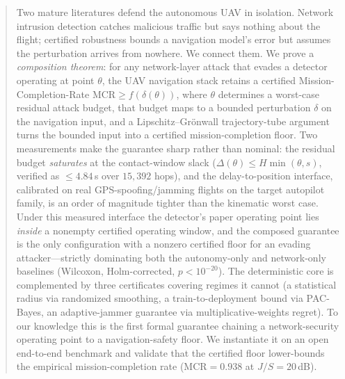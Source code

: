 \documentclass[conference]{IEEEtran}
\newcommand{\MCR}{\mathrm{MCR}}
\begin{document}
\begin{abstract}
Two mature literatures defend the autonomous UAV in isolation. Network
intrusion detection catches malicious traffic but says nothing about the flight;
certified robustness bounds a navigation model's error but assumes the
perturbation arrives from nowhere. We connect them. We prove a \emph{composition
theorem}: for any network-layer attack that evades a detector operating at point
$\theta$, the UAV navigation stack retains a certified Mission-Completion-Rate
$\MCR\ge f(\delta(\theta))$, where $\theta$ determines a worst-case residual
attack budget, that budget maps to a bounded perturbation $\delta$ on the
navigation input, and a Lipschitz--Grönwall trajectory-tube argument turns the
bounded input into a certified mission-completion floor. Two measurements make
the guarantee sharp rather than nominal: the residual budget \emph{saturates}
at the contact-window slack ($\Delta(\theta)\le H\min(\theta,s)$, verified as
$\le4.84$\,s over $15{,}392$ hops), and the delay-to-position interface,
calibrated on real GPS-spoofing/jamming flights on the target autopilot family,
is an order of magnitude tighter than the kinematic worst case. Under this
measured interface the detector's paper operating point lies \emph{inside} a
nonempty certified operating window, and the composed guarantee is the only
configuration with a nonzero certified floor for an evading attacker---strictly
dominating both the autonomy-only and network-only baselines (Wilcoxon,
Holm-corrected, $p<10^{-20}$). The deterministic core is complemented by three
certificates covering regimes it cannot (a statistical radius via randomized
smoothing, a train-to-deployment bound via PAC-Bayes, an adaptive-jammer
guarantee via multiplicative-weights regret). To our knowledge this is the first
formal guarantee chaining a network-security operating point to a
navigation-safety floor. We instantiate it on an open end-to-end benchmark and
validate that the certified floor lower-bounds the empirical mission-completion
rate ($\text{MCR}=0.938$ at $J/S{=}20$\,dB).
\end{abstract}
\end{document}
